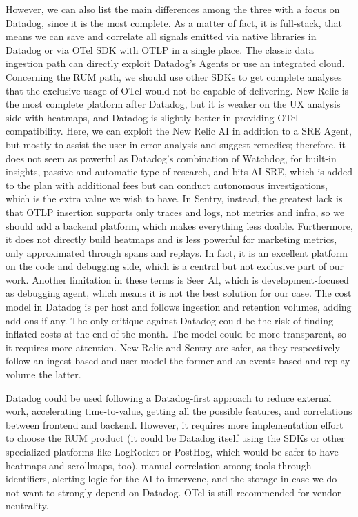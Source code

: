 \documentclass[12pt,a4paper,openright,twoside]{book}
\begin{document}
However, we can also list the main differences among the three with a focus on Datadog, since it is the most complete. As a matter of fact, it is full-stack, that means we can save and correlate all signals emitted via native libraries in Datadog or via OTel SDK with OTLP in a single place. The classic data ingestion path can directly exploit Datadog's Agents or use an integrated cloud. Concerning the RUM path, we should use other SDKs to get complete analyses that the exclusive usage of OTel would not be capable of delivering. New Relic is the most complete platform after Datadog, but it is weaker on the UX analysis side with heatmaps, and Datadog is slightly better in providing OTel-compatibility. Here, we can exploit the New Relic AI in addition to a \ac{SRE} Agent, but mostly to assist the user in error analysis and suggest remedies; therefore, it does not seem as powerful as Datadog's combination of Watchdog, for built-in insights, passive and automatic type of research, and bits AI SRE, which is added to the plan with additional fees but can conduct autonomous investigations, which is the extra value we wish to have. In Sentry, instead, the greatest lack is that OTLP insertion supports only traces and logs, not metrics and infra, so we should add a backend platform, which makes everything less doable. Furthermore, it does not directly build heatmaps and is less powerful for marketing metrics, only approximated through spans and replays. In fact, it is an excellent platform on the code and debugging side, which is a central but not exclusive part of our work. Another limitation in these terms is Seer AI, which is development-focused as debugging agent, which means it is not the best solution for our case. 
The cost model in Datadog is per host and follows ingestion and retention volumes, adding add-ons if any. The only critique against Datadog could be the risk of finding inflated costs at the end of the month. The model could be more transparent, so it requires more attention. New Relic and Sentry are safer, as they respectively follow an ingest-based and user model the former and an events-based and replay volume the latter. 

Datadog could be used following a Datadog-first approach to reduce external work, accelerating time-to-value, getting all the possible features, and correlations between frontend and backend. However, it requires more implementation effort to choose the RUM product (it could be Datadog itself using the SDKs or other specialized platforms like LogRocket or PostHog, which would be safer to have heatmaps and scrollmaps, too), manual correlation among tools through identifiers, alerting logic for the AI to intervene, and the storage in case we do not want to strongly depend on Datadog. OTel is still recommended for vendor-neutrality. 
\end{document}
